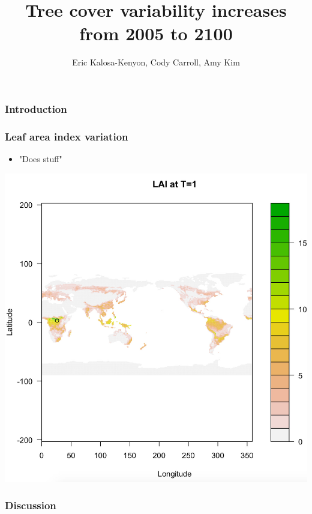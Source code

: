 \documentclass{beamer}
\title{Tree cover variability increases from 2005 to 2100}
\author{Eric Kalosa-Kenyon, Cody Carroll, Amy Kim}
\institute{University of California, Davis}
\date{}
\begin{document}
\frame{\titlepage}

\begin{frame}
    \frametitle{Introduction}
\end{frame}

\begin{frame}
    \frametitle{Leaf area index variation}
    \begin{itemize}
        \item "Does stuff"
    \end{itemize}
    \includegraphics[width=\textwidth]{../img/LAI global t0.jpg}
\end{frame}

\begin{frame}
    \frametitle{Discussion}
\end{frame}
\end{document}
